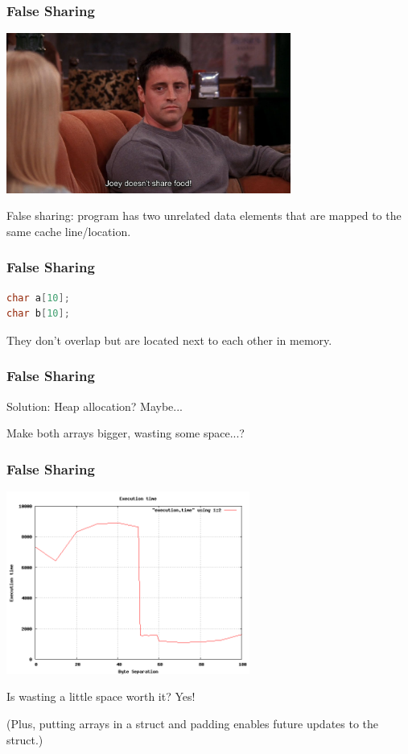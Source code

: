 \begin{frame}
\frametitle{False Sharing}

\begin{center}
	\includegraphics[width=0.7\textwidth]{images/joey-friends.jpg}
\end{center}

False sharing: program has two unrelated data elements that are mapped to the same cache line/location.

\end{frame}


\begin{frame}[fragile]
\frametitle{False Sharing}



\begin{lstlisting}[language=C]
char a[10];
char b[10];
\end{lstlisting}

They don't overlap but are located next to each other in memory.

\end{frame}


\begin{frame}
\frametitle{False Sharing}

Solution: Heap allocation? Maybe... 

Make both arrays bigger, wasting some space...?

\end{frame}


\begin{frame}
\frametitle{False Sharing}

\begin{center}
\includegraphics[width=0.6\textwidth]{images/falsesharing.png}
\end{center}

Is wasting a little space worth it? Yes!

(Plus, putting arrays in a struct
and padding enables future updates to the struct.)
\end{frame}

